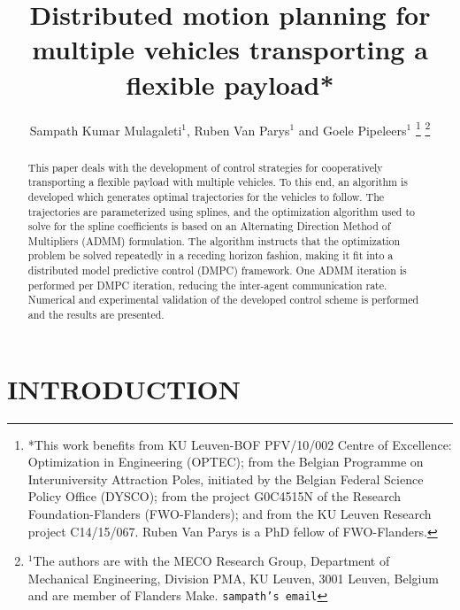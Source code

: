 \documentclass[letterpaper, 10 pt, conference]{ieeeconf}
\title{\LARGE \bf
Distributed motion planning for multiple
vehicles transporting a flexible payload*
}
\author{Sampath Kumar Mulagaleti$^{1}$, Ruben Van Parys$^{1}$ and Goele Pipeleers$^{1}$%
\thanks{*This work benefits from KU Leuven-BOF PFV/10/002 Centre of Excellence: Optimization in Engineering (OPTEC); from the Belgian Programme on Interuniversity Attraction Poles, initiated by the Belgian Federal Science Policy Office (DYSCO); from the project G0C4515N of the Research Foundation-Flanders (FWO-Flanders); and from the KU Leuven Research project C14/15/067. Ruben Van Parys is a PhD fellow of FWO-Flanders. }%
\thanks{$^{1}$The authors are with the MECO Research Group, Department of Mechanical Engineering, Division PMA, KU Leuven, 3001 Leuven, Belgium and are member of Flanders Make. \texttt{sampath's email}}
}
\begin{document}
\maketitle
\thispagestyle{empty}
\pagestyle{empty}


\begin{abstract}
This paper deals with the development of control strategies for cooperatively transporting a flexible payload with multiple vehicles. To this end, an algorithm is
developed which generates optimal trajectories for the vehicles to follow. The trajectories are parameterized using splines, and the optimization algorithm used to solve for the spline coefficients is based on an Alternating Direction Method of Multipliers (ADMM) formulation. The algorithm instructs that the
optimization problem be solved repeatedly in a receding horizon fashion, making it fit into a distributed model predictive control (DMPC) framework. One ADMM iteration is performed per DMPC iteration, reducing the inter-agent communication rate. Numerical and experimental validation of the developed control scheme is performed and the results are presented.
\end{abstract}


\section{INTRODUCTION}
\end{document}
